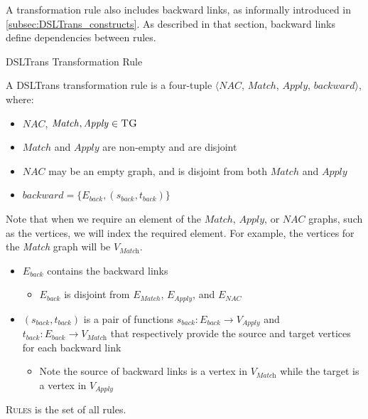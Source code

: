 A transformation rule also includes backward links, as informally introduced in \cref{subsec:DSLTrans_constructs}. As described in that section, backward links define dependencies between rules. 


\begin{definition}{DSLTrans Transformation Rule\\}
\label{def:transformation_rule}

A DSLTrans transformation rule is a four-tuple $\big\langle \mathit{NAC}$, $\mathit{Match}$, $\mathit{Apply}$, $\mathit{backward}\big\rangle$, where:

\begin{itemize}
\item $\mathit{NAC}$, $\mathit{Match}, \mathit{Apply} \in \textsc{TG}$
\item $\mathit{Match}$ and $\mathit{Apply} $ are non-empty and are disjoint
\item $\mathit{NAC}$ may be an empty graph, and is disjoint from both $\mathit{Match}$ and $\mathit{Apply} $
\item $\mathit{backward} = \{E_{back}, (s_{back}, t_{back})\}$
\end{itemize}  

Note that when we require an element of the $\mathit{Match}$, $\mathit{Apply}$, or $\mathit{NAC}$ graphs, such as the vertices, we will index the required element. For example, the vertices for the \textit{Match} graph will be $V_{\textit{Match}}$.

\begin{itemize}
\item $E_{back}$ contains the backward links
\begin{itemize}
\item $E_{back} $ is disjoint from $E_{Match}$,  $E_{Apply}$, and $E_{NAC}$
\end{itemize}
\item $(s_{back}, t_{back})$ is a pair of functions $s_{back}: E_{back}\rightarrow V_{\textit{Apply}}$ and $t_{back}: E_{back}\rightarrow V_{\textit{Match}}$ that respectively provide the source and target vertices for each backward link
\begin{itemize}
\item Note the source of backward links is a vertex in $V_{\textit{Match}}$ while the target is a vertex in $V_{\textit{Apply}}$
\end{itemize}
\end{itemize}

\textsc{Rules} is the set of all rules.

\end{definition}

